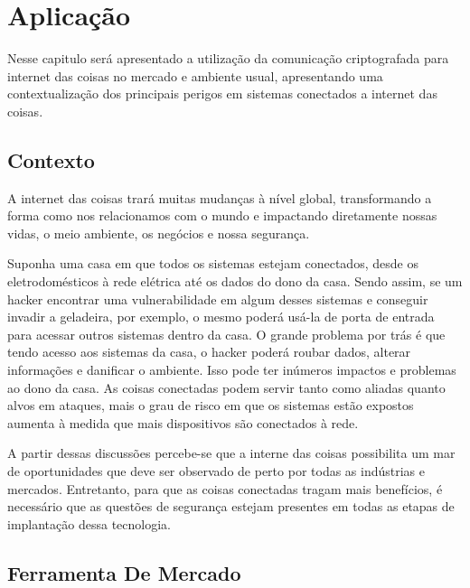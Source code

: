 \documentclass[12pt]{article}
\begin{document}
\section{Aplicação}

Nesse capitulo será apresentado a utilização da comunicação criptografada para internet das coisas no mercado e ambiente usual, apresentando uma contextualização dos principais perigos em sistemas conectados a internet das coisas.

\subsection{Contexto} 

A internet das coisas trará muitas mudanças à nível global, transformando a forma como nos relacionamos com o mundo e impactando diretamente nossas vidas, o meio ambiente, os negócios e nossa segurança.


Suponha uma casa em que todos os sistemas estejam conectados, desde os eletrodomésticos à rede elétrica até os dados do dono da casa. Sendo assim, se um hacker encontrar uma vulnerabilidade em algum desses sistemas e conseguir invadir a geladeira, por exemplo, o mesmo poderá usá-la de porta de entrada para acessar outros sistemas dentro da casa. O grande problema por trás é que tendo acesso aos sistemas da casa, o hacker poderá roubar dados, alterar informações e danificar o ambiente. Isso pode ter inúmeros impactos e problemas ao dono da casa.
As coisas conectadas podem servir tanto como aliadas quanto alvos em ataques, mais o grau de risco em que os sistemas estão expostos aumenta à medida que mais dispositivos são conectados à rede.


A partir dessas discussões percebe-se que a interne das coisas possibilita um mar de oportunidades que deve ser observado de perto por todas as indústrias e mercados. Entretanto, para que as coisas conectadas tragam mais benefícios, é necessário que as questões de segurança estejam presentes em todas as etapas de implantação dessa tecnologia.

\subsection{Ferramenta De Mercado}
\end{document}
